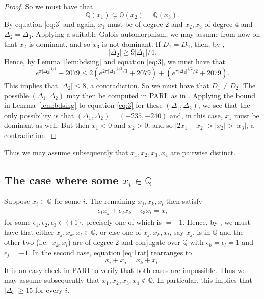 \documentclass[12pt,a4paper,oneside]{amsart}
\begin{document}
\begin{proof}
		So we must have that
		\[ \mathbb Q (x_1) \subsetneq \mathbb Q (x_2) = \mathbb Q (x_3).\]
		By equation \eqref{eq:3} and \cite[Th.~1.5]{Fowler24} again, $x_1$ must be of degree $2$ and $x_2, x_3$ of degree $4$ and $\Delta_2 = \Delta_3$. Applying a suitable Galois automorphism, we may assume from now on that $x_2$ is dominant, and so $x_3$ is not dominant. If $D_1 = D_2$, then, by \cite[Prop.~7.8]{Fowler24}, 
		\[\lvert \Delta_2 \rvert \geq 9 \lvert \Delta_1 \rvert / 4.\] 
		 Hence, by Lemma~\ref{lem:bdsing} and equation \eqref{eq:3}, we must have that
		\[ e^{ \pi \lvert \Delta_2 \rvert^{1/2}} - 2079 \leq 2 ( e^{2 \pi \lvert \Delta_2 \rvert^{1/2}/3} + 2079) + ( e^{ \pi \lvert \Delta_2 \rvert^{1/2}/2}+ 2079).\]
	This implies that $\lvert \Delta_2 \rvert \leq 8$, a contradiction. So we must have that $D_1 \neq D_2$. The possible $(\Delta_1, \Delta_2)$ may then be computed in PARI, as in \cite[Prop.~7.6]{Fowler24}. Applying the bound in Lemma~\ref{lem:bdsing} to equation \eqref{eq:3} for these $(\Delta_1, \Delta_2)$, we see that the only possibility is that $(\Delta_1, \Delta_2) = (-235, -240)$ and, in this case, $x_1$ must be dominant as well. But then $x_1 < 0$ and $x_2>0$, and so  $\lvert 2 x_1 - x_2 \rvert > \lvert x_2 \rvert > \lvert x_3 \rvert$, a contradiction.
	\end{proof}

Thus we may assume subsequently that $x_1, x_2, x_3, x_4$ are pairwise distinct.

\subsection{The case where some \texorpdfstring{$x_i \in \mathbb{Q}$}{xi in Q}}\label{subsec:rational}

Suppose $x_i \in \mathbb Q$ for some $i$. The remaining $x_j, x_k, x_l$ then satisfy 
\begin{align}\label{eq:1rat}
\epsilon_1 x_j + \epsilon_2 x_k + \epsilon_3 x_l = x_i
\end{align}
for some $\epsilon_1, \epsilon_2, \epsilon_3 \in \{\pm 1\}$, precisely one of which is $=-1$. Hence, by \cite[Theorem~1.1]{Fowler23}, we must have that either $x_j, x_k, x_l \in \mathbb Q$, or else one of $x_j, x_k, x_l$, say $x_j$, is in $\mathbb Q$ and the other two (i.e.~$x_k, x_l$) are of degree $2$ and conjugate over $\mathbb Q$ with $\epsilon_k = \epsilon_l = 1$ and $\epsilon_j = -1$. In the second case, equation \eqref{eq:1rat} rearranges to
\[x_i + x_j = x_k + x_l.\] 
It is an easy check in PARI to verify that both cases are impossible. Thus we may assume subsequently that $x_1, x_2, x_3, x_4 \notin \mathbb{Q}$. In particular, this implies that $\lvert \Delta_i \rvert \geq 15$ for every $i$.
\end{document}
